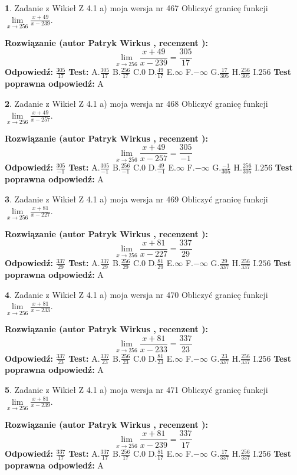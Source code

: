 \documentclass[12pt, a4paper]{article}
\theoremstyle{definition} %
\newtheorem{zad}{}
\newcommand{\zadStart}[1]{\begin{zad}#1\newline}
\newcommand{\zadStop}{\end{zad}}
\newcommand{\rozwStart}[2]{\noindent \textbf{Rozwiązanie (autor #1 , recenzent #2): }\newline}
\newcommand{\rozwStop}{\newline}
\newcommand{\odpStart}{\noindent \textbf{Odpowiedź:}\newline}
\newcommand{\odpStop}{\newline}
\newcommand{\testStart}{\noindent \textbf{Test:}\newline}
\newcommand{\testStop}{\newline}
\newcommand{\kluczStart}{\noindent \textbf{Test poprawna odpowiedź:}\newline}
\newcommand{\kluczStop}{\newline}
\begin{document}
\zadStart{Zadanie z Wikieł Z 4.1 a) moja wersja nr 467}
Obliczyć granicę funkcji $\lim\limits_{x\to256}\frac{x+49}{x-239}$.
\zadStop
\rozwStart{Patryk Wirkus}{}
$$\lim\limits_{x\to256}\frac{x+49}{x-239} = \frac{305}{17}$$
\rozwStop
\odpStart
$\frac{305}{17}$
\odpStop
\testStart
A.$\frac{305}{17}$
B.$\frac{256}{17}$
C.$0$
D.$\frac{49}{17}$
E.$\infty$
F.$-\infty$
G.$\frac{17}{305}$
H.$\frac{256}{305}$
I.$256$
\testStop
\kluczStart
A
\kluczStop



\zadStart{Zadanie z Wikieł Z 4.1 a) moja wersja nr 468}
Obliczyć granicę funkcji $\lim\limits_{x\to256}\frac{x+49}{x-257}$.
\zadStop
\rozwStart{Patryk Wirkus}{}
$$\lim\limits_{x\to256}\frac{x+49}{x-257} = \frac{305}{-1}$$
\rozwStop
\odpStart
$\frac{305}{-1}$
\odpStop
\testStart
A.$\frac{305}{-1}$
B.$\frac{256}{-1}$
C.$0$
D.$\frac{49}{-1}$
E.$\infty$
F.$-\infty$
G.$\frac{-1}{305}$
H.$\frac{256}{305}$
I.$256$
\testStop
\kluczStart
A
\kluczStop



\zadStart{Zadanie z Wikieł Z 4.1 a) moja wersja nr 469}
Obliczyć granicę funkcji $\lim\limits_{x\to256}\frac{x+81}{x-227}$.
\zadStop
\rozwStart{Patryk Wirkus}{}
$$\lim\limits_{x\to256}\frac{x+81}{x-227} = \frac{337}{29}$$
\rozwStop
\odpStart
$\frac{337}{29}$
\odpStop
\testStart
A.$\frac{337}{29}$
B.$\frac{256}{29}$
C.$0$
D.$\frac{81}{29}$
E.$\infty$
F.$-\infty$
G.$\frac{29}{337}$
H.$\frac{256}{337}$
I.$256$
\testStop
\kluczStart
A
\kluczStop



\zadStart{Zadanie z Wikieł Z 4.1 a) moja wersja nr 470}
Obliczyć granicę funkcji $\lim\limits_{x\to256}\frac{x+81}{x-233}$.
\zadStop
\rozwStart{Patryk Wirkus}{}
$$\lim\limits_{x\to256}\frac{x+81}{x-233} = \frac{337}{23}$$
\rozwStop
\odpStart
$\frac{337}{23}$
\odpStop
\testStart
A.$\frac{337}{23}$
B.$\frac{256}{23}$
C.$0$
D.$\frac{81}{23}$
E.$\infty$
F.$-\infty$
G.$\frac{23}{337}$
H.$\frac{256}{337}$
I.$256$
\testStop
\kluczStart
A
\kluczStop



\zadStart{Zadanie z Wikieł Z 4.1 a) moja wersja nr 471}
Obliczyć granicę funkcji $\lim\limits_{x\to256}\frac{x+81}{x-239}$.
\zadStop
\rozwStart{Patryk Wirkus}{}
$$\lim\limits_{x\to256}\frac{x+81}{x-239} = \frac{337}{17}$$
\rozwStop
\odpStart
$\frac{337}{17}$
\odpStop
\testStart
A.$\frac{337}{17}$
B.$\frac{256}{17}$
C.$0$
D.$\frac{81}{17}$
E.$\infty$
F.$-\infty$
G.$\frac{17}{337}$
H.$\frac{256}{337}$
I.$256$
\testStop
\kluczStart
A
\kluczStop
\end{document}
